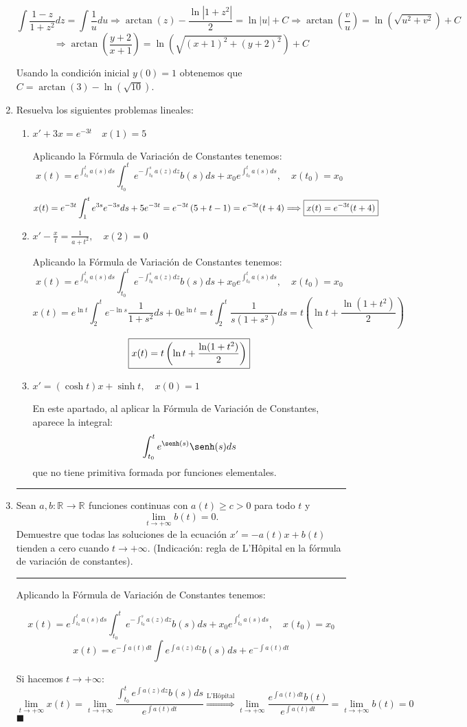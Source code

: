\documentclass[12pt]{article}
\newcommand{\R}[1][]{\mathbb{R}^{#1}}
\newcommand{\solution}[1]{\text{\fbox{$#1$}}}
\newcommand{\FVCP}[5]{x(t)=e^{#1}\int_{#4}^{t}e^{#2}#3ds+#5e^{#1}}
\newcommand{\FVC}{x(t)=e^{\int_{t_0}^{t}a(s)ds}\int_{t_0}^te^{-\int_{t_0}^{s}a(z)dz}b(s)ds+x_0e^{\int_{t_0}^{t}a(s)ds}, \quad x(t_0)=x_0}
\newcommand{\qued}{\hfill$\blacksquare$}
\begin{document}
\begin{enumerate}
\[
\int \frac{1-z}{1+z^2}dz=\int \frac{1}{u}du \Longrightarrow \arctan(z)-\frac{\ln|1+z^2|}{2}=\ln|u|+C \Longrightarrow \arctan\left(\frac{v}{u}\right) = \ln(\sqrt{u^2+v^2})+C 
\]
\[
\Longrightarrow \arctan\left(\frac{y+2}{x+1}\right) = \ln(\sqrt{(x+1)^2+(y+2)^2})+C
\]

Usando la condición inicial $y(0)=1$ obtenemos que $C=\arctan(3)-\ln(\sqrt{10})$.

\newpage
\item Resuelva los siguientes problemas lineales:

\begin{enumerate}
\item $x'+3x=e^{-3t} \quad x(1)=5$

Aplicando la Fórmula de Variación de Constantes tenemos:
\[
\FVC
\]
\[
\FVCP{-3t}{3s}{e^{-3s}}{1}{5} = e^{-3t}\left( 5 + t - 1 \right) = e^{-3t}(t+4) \Longrightarrow \solution{x(t)= e^{-3t}(t+4)}
\]

\item $\displaystyle x'-\frac{x}{t}=\frac{1}{a+t^2}, \quad x(2)=0$

Aplicando la Fórmula de Variación de Constantes tenemos:
\[
\FVC
\]
\[
\FVCP{\ln t}{-\ln s}{\frac{1}{1+s^2}}{2}{0} = t\int_2^t\frac{1}{s(1+s^2)}ds=t\left( \ln t + \frac{\ln(1+t^2)}{2} \right)
\]

\[
\solution{x(t)=t\left( \ln t + \frac{\ln(1+t^2)}{2} \right)}
\]

\item $x'=(\cosh t)x+\sinh t, \quad x(0)=1$

En este apartado, al aplicar la Fórmula de Variación de Constantes, aparece la integral:
\[
\int_{t_0}^{t}e^{\senh(s)}\senh(s) ds
\]
que no tiene primitiva formada por funciones elementales.
\end{enumerate}

\newpage

\hrule
\item Sean $a,b: \R \longrightarrow \R $ funciones continuas con $a(t)\geq c > 0$ para todo $t$ y
\[
\lim_{t \to +\infty}b(t)=0.
\]
Demuestre que todas las soluciones de la ecuación $x'=-a(t)x+b(t)$ tienden a cero cuando $t\longrightarrow +\infty$. (Indicación: regla de L'Hôpital en la fórmula de variación de constantes).
\hrule

Aplicando la Fórmula de Variación de Constantes tenemos:

\[
\FVC
\]
\[
x(t)=e^{-\int a(t)dt}\int e^{\int a(z)dz}b(s)ds+e^{-\int a(t)dt}
\]

Si hacemos $t\to +\infty$:
\[
\lim_{t\to +\infty}x(t)=\lim_{t\to +\infty}\frac{\int_{t_0}^t e^{\int a(z)dz}b(s)ds}{e^{\int a(t)dt}} \stackrel{\text{L'Hôpital}}{\Longrightarrow} \lim_{t\to +\infty} \frac{e^{\int a(t)dt}b(t)}{e^{\int a(t)dt}}=\lim_{t\to +\infty} b(t)=0
\]
\qued
\end{enumerate}
\end{document}
